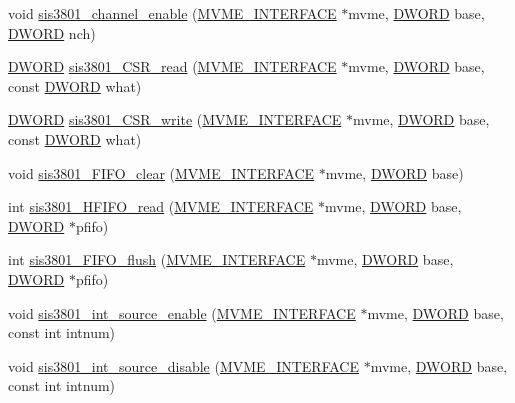 \begin{DoxyCompactItemize}
\item 
void \hyperlink{sis3801_8c_ace2bca482a33ec77baf90ddadc42b3e4}{sis3801\_\-channel\_\-enable} (\hyperlink{structMVME__INTERFACE}{MVME\_\-INTERFACE} $\ast$mvme, \hyperlink{vt2_8h_a798af1e30bc65f319c1a246cecf59e39}{DWORD} base, \hyperlink{vt2_8h_a798af1e30bc65f319c1a246cecf59e39}{DWORD} nch)
\item 
\hyperlink{vt2_8h_a798af1e30bc65f319c1a246cecf59e39}{DWORD} \hyperlink{sis3801_8c_adcfb24a5d2030571cd363fb0d88a3f1e}{sis3801\_\-CSR\_\-read} (\hyperlink{structMVME__INTERFACE}{MVME\_\-INTERFACE} $\ast$mvme, \hyperlink{vt2_8h_a798af1e30bc65f319c1a246cecf59e39}{DWORD} base, const \hyperlink{vt2_8h_a798af1e30bc65f319c1a246cecf59e39}{DWORD} what)
\item 
\hyperlink{vt2_8h_a798af1e30bc65f319c1a246cecf59e39}{DWORD} \hyperlink{sis3801_8c_aa9c33c651f53e2fe7bc8f3e38bb33495}{sis3801\_\-CSR\_\-write} (\hyperlink{structMVME__INTERFACE}{MVME\_\-INTERFACE} $\ast$mvme, \hyperlink{vt2_8h_a798af1e30bc65f319c1a246cecf59e39}{DWORD} base, const \hyperlink{vt2_8h_a798af1e30bc65f319c1a246cecf59e39}{DWORD} what)
\item 
void \hyperlink{sis3801_8c_aee9b0f8f5e70dcaab5443c4e2e533dad}{sis3801\_\-FIFO\_\-clear} (\hyperlink{structMVME__INTERFACE}{MVME\_\-INTERFACE} $\ast$mvme, \hyperlink{vt2_8h_a798af1e30bc65f319c1a246cecf59e39}{DWORD} base)
\item 
int \hyperlink{sis3801_8c_a1b473f4e9a07343d020798be54dcf54b}{sis3801\_\-HFIFO\_\-read} (\hyperlink{structMVME__INTERFACE}{MVME\_\-INTERFACE} $\ast$mvme, \hyperlink{vt2_8h_a798af1e30bc65f319c1a246cecf59e39}{DWORD} base, \hyperlink{vt2_8h_a798af1e30bc65f319c1a246cecf59e39}{DWORD} $\ast$pfifo)
\item 
int \hyperlink{sis3801_8c_abcf16fa0ffafda6f1fa5c219d31f7630}{sis3801\_\-FIFO\_\-flush} (\hyperlink{structMVME__INTERFACE}{MVME\_\-INTERFACE} $\ast$mvme, \hyperlink{vt2_8h_a798af1e30bc65f319c1a246cecf59e39}{DWORD} base, \hyperlink{vt2_8h_a798af1e30bc65f319c1a246cecf59e39}{DWORD} $\ast$pfifo)
\item 
void \hyperlink{sis3801_8c_a5058a04d28f3bd2aa05e7c1f2f91c871}{sis3801\_\-int\_\-source\_\-enable} (\hyperlink{structMVME__INTERFACE}{MVME\_\-INTERFACE} $\ast$mvme, \hyperlink{vt2_8h_a798af1e30bc65f319c1a246cecf59e39}{DWORD} base, const int intnum)
\item 
void \hyperlink{sis3801_8c_aa0ca70723ac84258800e438bee4af17e}{sis3801\_\-int\_\-source\_\-disable} (\hyperlink{structMVME__INTERFACE}{MVME\_\-INTERFACE} $\ast$mvme, \hyperlink{vt2_8h_a798af1e30bc65f319c1a246cecf59e39}{DWORD} base, const int intnum)

\end{DoxyCompactItemize}
